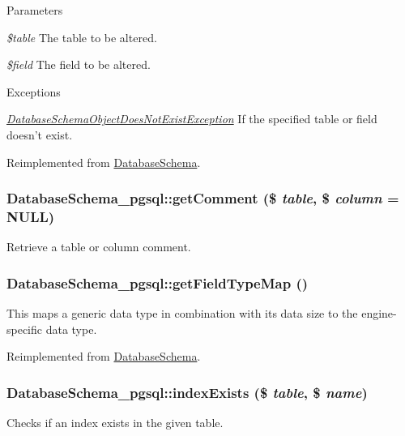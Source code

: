 \begin{DoxyParams}{Parameters}
\item[{\em \$table}]The table to be altered. \item[{\em \$field}]The field to be altered.\end{DoxyParams}

\begin{DoxyExceptions}{Exceptions}
\item[{\em \hyperlink{classDatabaseSchemaObjectDoesNotExistException}{DatabaseSchemaObjectDoesNotExistException}}]If the specified table or field doesn't exist. \end{DoxyExceptions}


Reimplemented from \hyperlink{classDatabaseSchema_ae4de35c98eed09a4c38d82e3f17ed8a6}{DatabaseSchema}.\hypertarget{classDatabaseSchema__pgsql_aa500999b6f0ce930ece44f98659a7243}{
\subsubsection[{getComment}]{\setlength{\rightskip}{0pt plus 5cm}DatabaseSchema\_\-pgsql::getComment (\$ {\em table}, \/  \$ {\em column} = {\ttfamily NULL})}}
\label{classDatabaseSchema__pgsql_aa500999b6f0ce930ece44f98659a7243}
Retrieve a table or column comment. \hypertarget{classDatabaseSchema__pgsql_a918cab53fb09222d7b017c527bb9534e}{
\subsubsection[{getFieldTypeMap}]{\setlength{\rightskip}{0pt plus 5cm}DatabaseSchema\_\-pgsql::getFieldTypeMap ()}}
\label{classDatabaseSchema__pgsql_a918cab53fb09222d7b017c527bb9534e}
This maps a generic data type in combination with its data size to the engine-\/specific data type. 

Reimplemented from \hyperlink{classDatabaseSchema_a82022c76c3131c4d745736d08321b788}{DatabaseSchema}.\hypertarget{classDatabaseSchema__pgsql_aee7c3f672034280888fd9533a7c98835}{
\subsubsection[{indexExists}]{\setlength{\rightskip}{0pt plus 5cm}DatabaseSchema\_\-pgsql::indexExists (\$ {\em table}, \/  \$ {\em name})}}
\label{classDatabaseSchema__pgsql_aee7c3f672034280888fd9533a7c98835}
Checks if an index exists in the given table.


